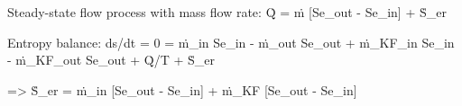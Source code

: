 Steady-state flow process with mass flow rate:  
Q̇ = ṁ [Se_out - Se_in] + Ṡ_er  

Entropy balance:  
ds/dt = 0 = ṁ_in Se_in - ṁ_out Se_out + ṁ_KF_in Se_in - ṁ_KF_out Se_out  
+ Q̇/T + Ṡ_er  

=> Ṡ_er = ṁ_in [Se_out - Se_in] + ṁ_KF [Se_out - Se_in]